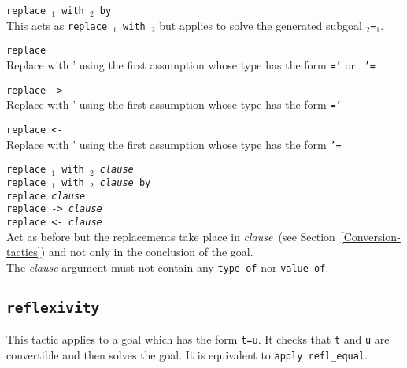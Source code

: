 \begin{coq_example*}
\begin{ErrMsgs}
\item {}
\end{ErrMsgs}

\begin{Variants}
\item {\tt replace {\term$_1$} with {\term$_2$} by \tac}\\ This acts
  as {\tt replace {\term$_1$} with {\term$_2$}} but applies {\tt \tac}
  to solve the generated subgoal {\tt \term$_2$=\term$_1$}.
\item {\tt replace {\term}}\\ Replace {\term} with {\term'} using the
  first assumption whose type has the form {\tt \term=\term'} or {\tt
    \term'=\term}
\item {\tt replace -> {\term}}\\ Replace {\term} with {\term'} using the
  first assumption whose type has the form {\tt \term=\term'}
\item {\tt replace <- {\term}}\\ Replace {\term} with {\term'} using the
  first assumption whose type has the form {\tt \term'=\term}
\item {\tt replace {\term$_1$} with {\term$_2$} \textit{clause} }\\
    {\tt replace {\term$_1$} with {\term$_2$} \textit{clause} by \tac }\\
    {\tt replace {\term} \textit{clause}}\\
    {\tt replace -> {\term} \textit{clause}}\\
    {\tt replace <- {\term} \textit{clause}}\\
    Act as before but the replacements take place in
    \textit{clause}~(see Section~\ref{Conversion-tactics}) and not only
    in the conclusion of the goal.\\
    The  \textit{clause} argument must  not contain  any \texttt{type  of} nor  \texttt{value  of}.
\end{Variants}

\subsection{\tt reflexivity
\label{reflexivity}
}

This tactic applies to a goal which has the form {\tt t=u}. It checks
that {\tt t} and {\tt u} are convertible and then solves the goal.
It is equivalent to {\tt apply refl\_equal}.


\end{coq_example*}
